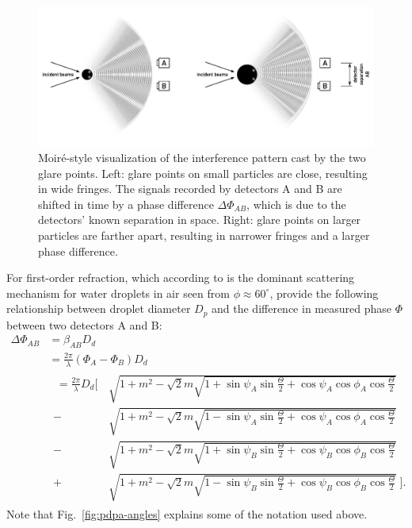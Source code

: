 \documentclass[11.5pt,oneside]{book}
\newcommand*{\figref}[1]{Fig.~\ref{#1}}
\begin{document}
\begin{figure}
    \centering
    \includegraphics[width=\textwidth]{img/setup/pdpa_moire_static.pdf}
    \caption{Moiré-style visualization of the interference pattern cast by the
    two glare points. Left: glare points on small particles are close, resulting
in wide fringes. The signals recorded by detectors A and B are shifted in time
by a phase difference $\Delta \Phi_{AB}$, which is due to the detectors' known
separation in space. Right: glare points on larger particles are farther apart,
resulting in narrower fringes and a larger phase difference.
\label{fig:pdpa-moire-static}}
\end{figure}

For first-order refraction, which according to \citet{Naqwi96} is the dominant scattering mechanism for water
droplets in air seen from $\phi\approx 60^\circ$, \citet{Albrecht03} provide the following
relationship between droplet diameter $D_p$ and the difference in measured
phase $\Phi$ between two detectors A and B:
\begin{equation}
    \begin{split}
        \Delta \Phi_{AB} &= \beta_{AB} D_d \\
                         &= \frac{2\pi}{\lambda} \left(\Phi_A - \Phi_B\right) D_d \\  
                         & 
        \begin{split}
            \;=\frac{2\pi}{\lambda} D_d \Bigg[\,&\sqrt{1+m^2-\sqrt{2} m
        \sqrt{1+\sin \psi_A \sin \frac{\Theta}{2} + \cos \psi_A \cos \phi_A \cos
    \frac{\Theta}{2}}} \\
        -{} &\sqrt{1+m^2-\sqrt{2} m \sqrt{1-\sin \psi_A \sin \frac{\Theta}{2} + \cos \psi_A \cos \phi_A \cos
    \frac{\Theta}{2}}}\\
        -{}&\sqrt{1+m^2-\sqrt{2} m \sqrt{1+\sin \psi_B \sin \frac{\Theta}{2} + \cos \psi_B \cos \phi_B \cos
    \frac{\Theta}{2}}}\\
    +{}&\sqrt{1+m^2-\sqrt{2} m \sqrt{1-\sin \psi_B \sin \frac{\Theta}{2} + \cos \psi_B \cos \phi_B \cos
    \frac{\Theta}{2}}}\; \Bigg]. \label{eq:pdpa-full}
\end{split}
    \end{split}
\end{equation}
Note that \figref{fig:pdpa-angles} explains some of the notation used above.
\end{document}
